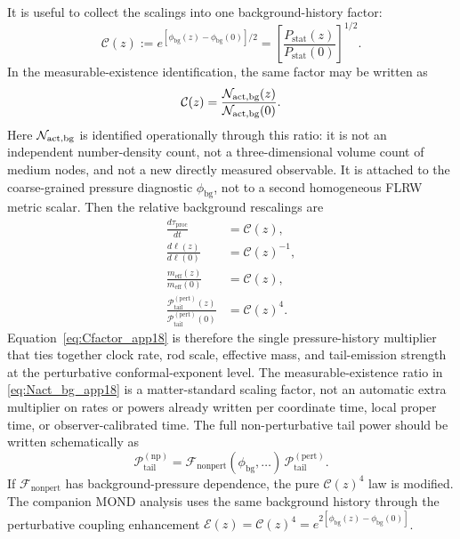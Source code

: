 \documentclass[11pt]{article}
\begin{document}
It is useful to collect the scalings into one background-history factor:
\begin{equation}
  \mathcal{C}(z)
  := e^{[\phi_{\mathrm{bg}}(z)-\phi_{\mathrm{bg}}(0)]/2}
  = \left[\frac{P_{\mathrm{stat}}(z)}{P_{\mathrm{stat}}(0)}\right]^{1/2}.
  \label{eq:Cfactor_app18}
\end{equation}
In the measurable-existence identification, the same factor may be written as
\begin{equation}
  \mathcal{C}(z)
  =
  \frac{\mathcal N_{\rm act,bg}(z)}
       {\mathcal N_{\rm act,bg}(0)}.
  \label{eq:Nact_bg_app18}
\end{equation}
Here $\mathcal N_{\rm act,bg}$ is identified operationally through this ratio:
it is not an independent number-density count, not a three-dimensional
volume count of medium nodes, and not a new directly measured observable.
It is attached to the coarse-grained pressure diagnostic
$\phi_{\mathrm{bg}}$, not to a second homogeneous FLRW metric scalar.
Then the relative background rescalings are
\begin{align}
  \frac{d\tau_{\mathrm{proc}}}{dt} &= \mathcal{C}(z),
  \label{eq:C_clock_app18}\\
  \frac{d\ell(z)}{d\ell(0)} &= \mathcal{C}(z)^{-1},
  \label{eq:C_rod_app18}\\
  \frac{m_{\mathrm{eff}}(z)}{m_{\mathrm{eff}}(0)} &= \mathcal{C}(z),
  \label{eq:C_mass_app18}\\
  \frac{\mathcal{P}_{\mathrm{tail}}^{(\mathrm{pert})}(z)}
       {\mathcal{P}_{\mathrm{tail}}^{(\mathrm{pert})}(0)}
  &= \mathcal{C}(z)^4.
  \label{eq:C_tail_app18}
\end{align}
Equation~\eqref{eq:Cfactor_app18} is therefore the single pressure-history
multiplier that ties together clock rate, rod scale, effective mass, and
tail-emission strength at the perturbative conformal-exponent level.  The
measurable-existence ratio in \eqref{eq:Nact_bg_app18} is a matter-standard
scaling factor, not an automatic extra multiplier on rates or powers already
written per coordinate time, local proper time, or observer-calibrated time.
The full non-perturbative tail power should be written schematically as
\begin{equation}
  \mathcal{P}_{\mathrm{tail}}^{(\mathrm{np})}
  = \mathcal{F}_{\mathrm{nonpert}}(\phi_{\mathrm{bg}},\ldots)\,
    \mathcal{P}_{\mathrm{tail}}^{(\mathrm{pert})}.
\end{equation}
If $\mathcal{F}_{\mathrm{nonpert}}$ has background-pressure dependence,
the pure $\mathcal{C}(z)^4$ law is modified.  The companion MOND analysis
uses the same background history through the perturbative coupling
enhancement
$\mathcal{E}(z)=\mathcal{C}(z)^4=e^{2[\phi_{\mathrm{bg}}(z)-\phi_{\mathrm{bg}}(0)]}$.
\end{document}
